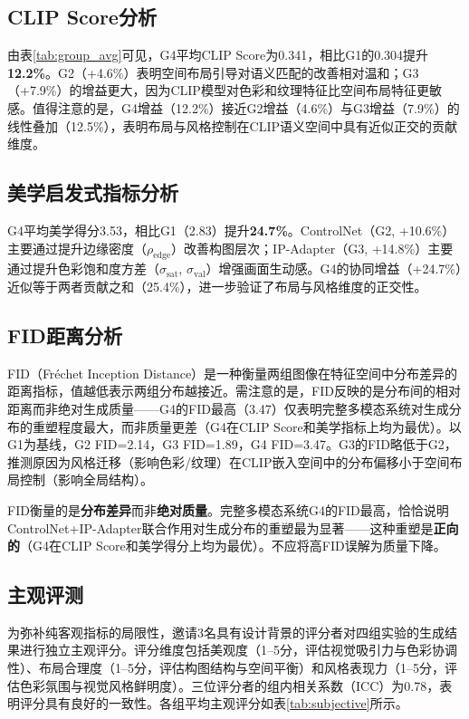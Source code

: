 \documentclass[12pt,a4paper]{ctexart}
\begin{document}
\subsection{CLIP Score分析}

由表\ref{tab:group_avg}可见，G4平均CLIP Score为0.341，相比G1的0.304提升\textbf{12.2\%}。G2（+4.6\%）表明空间布局引导对语义匹配的改善相对温和；G3（+7.9\%）的增益更大，因为CLIP模型对色彩和纹理特征比空间布局特征更敏感。值得注意的是，G4增益（12.2\%）接近G2增益（4.6\%）与G3增益（7.9\%）的线性叠加（12.5\%），表明布局与风格控制在CLIP语义空间中具有近似正交的贡献维度。

\subsection{美学启发式指标分析}

G4平均美学得分3.53，相比G1（2.83）提升\textbf{24.7\%}。ControlNet（G2, +10.6\%）主要通过提升边缘密度（$\rho_{\text{edge}}$）改善构图层次；IP-Adapter（G3, +14.8\%）主要通过提升色彩饱和度方差（$\sigma_{\text{sat}}$, $\sigma_{\text{val}}$）增强画面生动感。G4的协同增益（+24.7\%）近似等于两者贡献之和（25.4\%），进一步验证了布局与风格维度的正交性。

\subsection{FID距离分析}

FID（Fréchet Inception Distance）是一种衡量两组图像在特征空间中分布差异的距离指标，值越低表示两组分布越接近。需注意的是，FID反映的是分布间的相对距离而非绝对生成质量——G4的FID最高（3.47）仅表明完整多模态系统对生成分布的重塑程度最大，而非质量更差（G4在CLIP Score和美学指标上均为最优）。以G1为基线，G2 FID=2.14，G3 FID=1.89，G4 FID=3.47。G3的FID略低于G2，推测原因为风格迁移（影响色彩/纹理）在CLIP嵌入空间中的分布偏移小于空间布局控制（影响全局结构）。

\begin{keybox}[FID指标的解读要点]
FID衡量的是\textbf{分布差异}而非\textbf{绝对质量}。完整多模态系统G4的FID最高，恰恰说明ControlNet+IP-Adapter联合作用对生成分布的重塑最为显著——这种重塑是\textbf{正向的}（G4在CLIP Score和美学得分上均为最优）。不应将高FID误解为质量下降。
\end{keybox}

\subsection{主观评测}

为弥补纯客观指标的局限性，邀请3名具有设计背景的评分者对四组实验的生成结果进行独立主观评分。评分维度包括美观度（1--5分，评估视觉吸引力与色彩协调性）、布局合理度（1--5分，评估构图结构与空间平衡）和风格表现力（1--5分，评估色彩氛围与视觉风格鲜明度）。三位评分者的组内相关系数（ICC）为0.78，表明评分具有良好的一致性。各组平均主观评分如表\ref{tab:subjective}所示。
\end{document}
